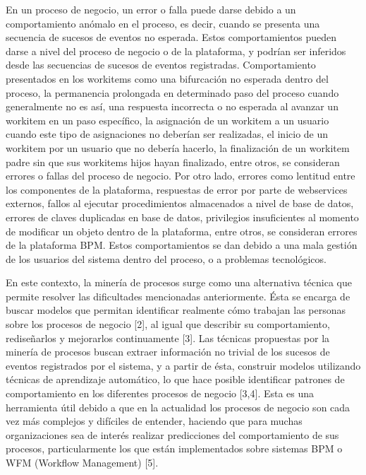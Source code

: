 En un proceso de negocio, un error o falla puede darse debido a un comportamiento anómalo en el proceso, es decir, cuando se presenta una secuencia de sucesos de eventos no esperada. Estos comportamientos pueden darse a nivel del proceso de negocio o de la plataforma, y podrían ser inferidos desde las secuencias de sucesos de eventos registradas. Comportamiento presentados en los workitems como una bifurcación no esperada dentro del proceso, la permanencia prolongada en determinado paso del proceso cuando generalmente no es así, una respuesta incorrecta o no esperada al avanzar un workitem en un paso específico, la asignación de un workitem a un usuario cuando este tipo de asignaciones no deberían ser realizadas, el inicio de un workitem por un usuario que no debería hacerlo, la finalización de un workitem padre sin que sus workitems hijos hayan finalizado, entre otros, se consideran errores o fallas del proceso de negocio. Por otro lado, errores como lentitud entre los componentes de la plataforma, respuestas de error por parte de webservices externos, fallos al ejecutar procedimientos almacenados a nivel de base de datos, errores de claves duplicadas en base de datos, privilegios insuficientes al momento de modificar un objeto dentro de la plataforma, entre otros, se consideran errores de la plataforma BPM. Estos comportamientos se dan debido a una mala gestión de los usuarios del sistema dentro del proceso, o a problemas tecnológicos.



En este contexto, la minería de procesos surge como una alternativa técnica que permite resolver las dificultades mencionadas anteriormente. Ésta se encarga de buscar modelos que permitan identificar realmente cómo trabajan las personas sobre los procesos de negocio [2], al igual que describir su comportamiento, rediseñarlos y mejorarlos continuamente [3]. Las técnicas propuestas por la minería de procesos buscan extraer información no trivial de los sucesos de eventos registrados por el sistema, y a partir de ésta, construir modelos utilizando técnicas de aprendizaje automático, lo que hace posible identificar patrones de comportamiento en los diferentes procesos de negocio [3,4]. Esta es una herramienta útil debido a que en la actualidad los procesos de negocio son cada vez más complejos y difíciles de entender, haciendo que para muchas organizaciones sea de interés realizar predicciones del comportamiento de sus procesos, particularmente los que están implementados sobre sistemas BPM o WFM (Workflow Management) [5].




